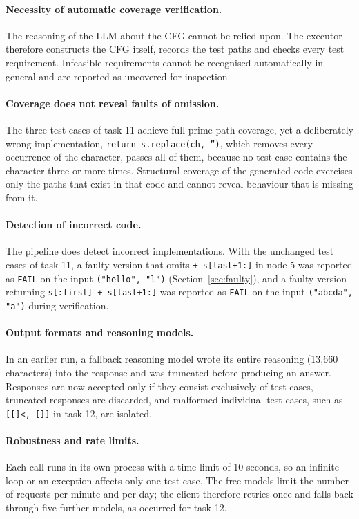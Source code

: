 \documentclass[11pt, a4paper]{article}
\begin{document}
\paragraph{Necessity of automatic coverage verification.} The reasoning of the LLM about the CFG cannot be relied upon. The executor therefore constructs the CFG itself, records the test paths and checks every test requirement. Infeasible requirements cannot be recognised automatically in general and are reported as uncovered for inspection.

\paragraph{Coverage does not reveal faults of omission.} The three test cases of task 11 achieve full prime path coverage, yet a deliberately wrong implementation, \texttt{return s.replace(ch, '')}, which removes every occurrence of the character, passes all of them, because no test case contains the character three or more times. Structural coverage of the generated code exercises only the paths that exist in that code and cannot reveal behaviour that is missing from it.

\paragraph{Detection of incorrect code.} The pipeline does detect incorrect implementations. With the unchanged test cases of task 11, a faulty version that omits \texttt{+ s[last+1:]} in node 5 was reported as \texttt{FAIL} on the input \texttt{("hello", "l")} (Section~\ref{sec:faulty}), and a faulty version returning \texttt{s[:first] + s[last+1:]} was reported as \texttt{FAIL} on the input \texttt{("abcda", "a")} during verification.

\paragraph{Output formats and reasoning models.} In an earlier run, a fallback reasoning model wrote its entire reasoning (13,660 characters) into the response and was truncated before producing an answer. Responses are now accepted only if they consist exclusively of test cases, truncated responses are discarded, and malformed individual test cases, such as \texttt{[[]<, []]} in task 12, are isolated.

\paragraph{Robustness and rate limits.} Each call runs in its own process with a time limit of 10 seconds, so an infinite loop or an exception affects only one test case. The free models limit the number of requests per minute and per day; the client therefore retries once and falls back through five further models, as occurred for task 12.
\end{document}
